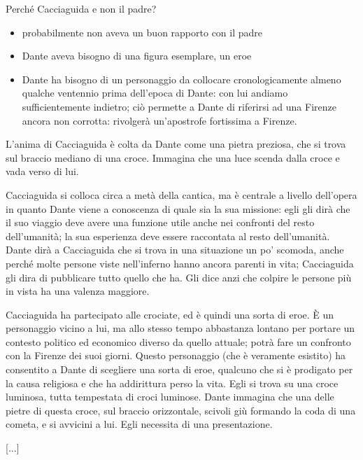 \documentclass[a4paper, twoside, titlepage]{book}
\newcommand{\salt}{\hspace{1em}[...]} %
\begin{document}
Perché Cacciaguida e non il padre?
\begin{itemize}
\item probabilmente non aveva un buon rapporto con il padre
\item Dante aveva bisogno di una figura esemplare, un eroe
\item Dante ha bisogno di un personaggio da collocare cronologicamente almeno qualche ventennio prima dell’epoca di Dante: con lui andiamo sufficientemente indietro; ciò permette a Dante di riferirsi ad una Firenze ancora non corrotta: rivolgerà un’apostrofe fortissima a Firenze.
\end{itemize}

L’anima di Cacciaguida è colta da Dante come una pietra preziosa, che si trova sul braccio mediano di una croce. Immagina che una luce scenda dalla croce e vada verso di lui.

Cacciaguida si colloca circa a metà della cantica, ma è centrale a livello dell’opera in quanto Dante viene a conoscenza di quale sia la sua missione: egli gli dirà che il suo viaggio deve avere una funzione utile anche nei confronti del resto dell’umanità; la sua esperienza deve essere raccontata al resto dell’umanità.
Dante dirà a Cacciaguida che si trova in una situazione un po’ scomoda, anche perché molte persone viste nell’inferno hanno ancora parenti in vita; Cacciaguida gli dira di pubblicare tutto quello che ha. Gli dice anzi che colpire le persone più in vista ha una valenza maggiore.

Cacciaguida ha partecipato alle crociate, ed
è quindi una sorta di eroe. È un personaggio
vicino a lui, ma allo stesso tempo
abbastanza lontano per portare un contesto
politico ed economico diverso da quello
attuale; potrà fare un confronto con la
Firenze dei suoi giorni. Questo personaggio
(che è veramente esistito) ha consentito a
Dante di scegliere una sorta di eroe,
qualcuno che si è prodigato per la causa
religiosa e che ha addirittura perso la vita.
Egli si trova su una croce luminosa, tutta
tempestata di croci luminose. Dante
immagina che una delle pietre di questa
croce, sul braccio orizzontale, scivoli giù
formando la coda di una cometa, e si
avvicini a lui. Egli necessita di una presentazione.

\newpage
\salt
\end{document}
